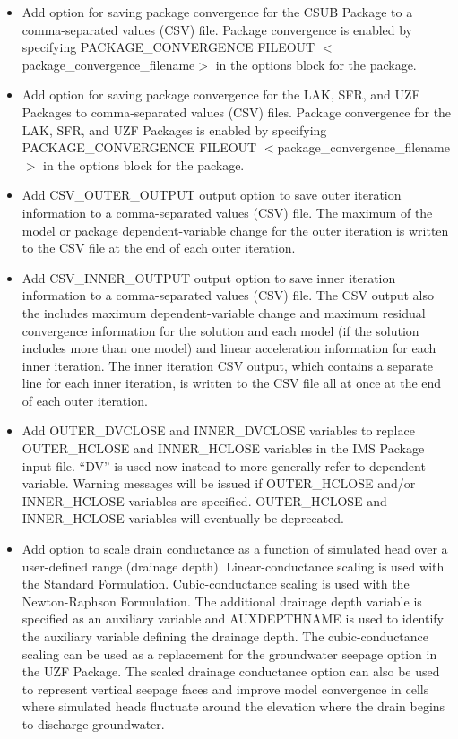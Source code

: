 \begin{itemize}
\begin{itemize}
		\item Add option for saving package convergence for the CSUB Package to a comma-separated values (CSV) file. Package convergence is enabled by specifying PACKAGE\_CONVERGENCE FILEOUT $<$package\_convergence\_filename$>$ in the options block for the package.
		\item Add option for saving package convergence for the LAK, SFR, and UZF Packages to comma-separated values (CSV) files. Package convergence for the LAK, SFR, and UZF Packages is enabled by specifying PACKAGE\_CONVERGENCE FILEOUT $<$package\_convergence\_filename$>$ in the options block for the package.
		\item Add CSV\_OUTER\_OUTPUT output option to save outer iteration information to a comma-separated values (CSV) file. The maximum of the model or package dependent-variable change for the outer iteration is written to the CSV file at the end of each outer iteration. 
		\item Add CSV\_INNER\_OUTPUT output option to save inner iteration information to a comma-separated values (CSV) file. The CSV output also the includes maximum dependent-variable change and maximum residual convergence information for the solution and each model (if the solution includes more than one model) and linear acceleration information for each inner iteration. The inner iteration CSV output, which contains a separate line for each inner iteration, is written to the CSV file all at once at the end of each outer iteration.
		\item Add OUTER\_DVCLOSE and INNER\_DVCLOSE variables to replace OUTER\_HCLOSE and INNER\_HCLOSE variables in the IMS Package input file. ``DV'' is used now instead to more generally refer to dependent variable.  Warning messages will be issued if OUTER\_HCLOSE and/or INNER\_HCLOSE variables are specified. OUTER\_HCLOSE and INNER\_HCLOSE variables will eventually be deprecated. 
		\item Add option to scale drain conductance as a function of simulated head over a user-defined range (drainage depth). Linear-conductance scaling is used with the Standard Formulation. Cubic-conductance scaling is used with the Newton-Raphson Formulation. The additional drainage depth variable is specified as an auxiliary variable and AUXDEPTHNAME is used to identify the auxiliary variable defining the drainage depth. The cubic-conductance scaling can be used as a replacement for the groundwater seepage option in the UZF Package. The scaled drainage conductance option can also be used to represent vertical seepage faces and improve model convergence in cells where simulated heads fluctuate around the elevation where the drain begins to discharge groundwater.

\end{itemize}
\end{itemize}
